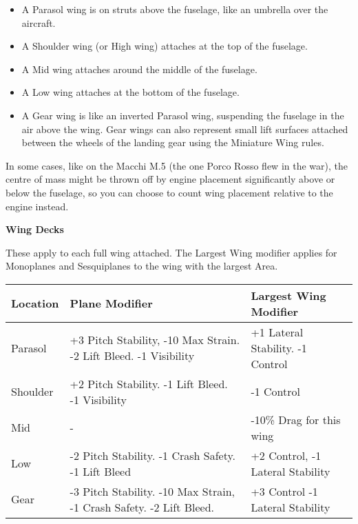 \documentclass{article}
\begin{document}
\begin{itemize}
    \item          A Parasol wing is on struts above the fuselage, like an
          umbrella over the aircraft.
    \item          A Shoulder wing (or High wing) attaches at the top of the
          fuselage.
    \item          A Mid wing attaches around the middle of the fuselage.
    \item          A Low wing attaches at the bottom of the fuselage.
    \item          A Gear wing is like an inverted Parasol wing, suspending the
          fuselage in the air above the wing. Gear wings can also represent
          small lift surfaces attached between the wheels of the landing gear
          using the Miniature Wing rules.
\end{itemize}

In some cases, like on the Macchi M.5 (the one Porco Rosso flew in the
war), the centre of mass might be thrown off by engine placement
significantly above or below the fuselage, so you can choose to count
wing placement relative to the engine instead.

\textbf{Wing Decks}

These apply to each full wing attached. The Largest Wing modifier
applies for Monoplanes and Sesquiplanes to the wing with the largest
Area.

\begin{tabular}{|l|l|l|}
    \hline
    Location   & Plane Modifier                                               & Largest Wing Modifier    \\\hline
    Parasol    & +3 Pitch Stability, -10 Max Strain. -2 Lift Bleed. -1
    Visibility & +1 Lateral Stability. -1 Control                                                        \\\hline
    Shoulder   & +2 Pitch Stability. -1 Lift Bleed. -1 Visibility             & -1
    Control                                                                                              \\\hline
    Mid        & -                                                            & -10\% Drag for this wing \\\hline
    Low        & -2 Pitch Stability. -1 Crash Safety. -1 Lift Bleed           & +2 Control,
    -1 Lateral Stability                                                                                 \\\hline
    Gear       & -3 Pitch Stability. -10 Max Strain, -1 Crash Safety. -2 Lift
    Bleed.     & +3 Control -1 Lateral Stability                                                         \\\hline
\end{tabular}
\end{document}
